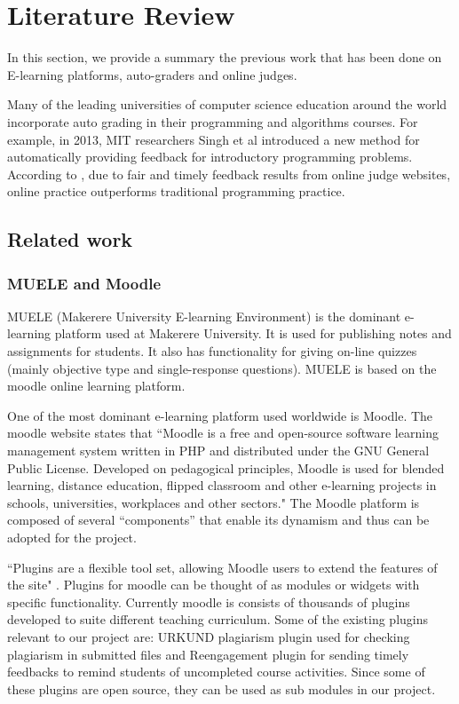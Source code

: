 \documentclass[12pt]{article}
\begin{document}
\newpage

\section{Literature Review}
	In this section, we provide a summary the previous work that has been done on E-learning platforms, auto-graders and online judges.
	
	Many of the leading universities of computer science education around the world incorporate auto grading in their 			programming and algorithms courses. For example, in 2013, MIT researchers Singh et al \cite{singh} introduced a new method for automatically providing feedback for introductory programming problems. According to \cite{ojpot}, due to fair and timely feedback results from online judge websites, online practice outperforms traditional programming practice.

	\subsection{Related work}
		\subsubsection{MUELE and Moodle}
		MUELE (Makerere University E-learning Environment) \cite{muele} is the dominant e-learning platform used at Makerere University. It is used for publishing notes and assignments for students. It also has functionality for giving on-line quizzes (mainly objective type and single-response questions). MUELE is based on the moodle online learning platform.
		
		One of the most dominant e-learning platform used worldwide is Moodle. The moodle website \cite{moodle} states that ``Moodle is a free and open-source software 	learning management system written in PHP and distributed under the GNU General Public License. Developed on pedagogical principles, Moodle is used for blended learning, distance education, flipped classroom and other e-learning projects in schools, universities, workplaces and other sectors." The Moodle platform is composed of several “components” that enable its dynamism and thus can be adopted for the project.
		
		``Plugins are a flexible tool set, allowing Moodle users to extend the features of the site" \cite{moodle}. Plugins for moodle can be thought of as modules or widgets with specific functionality. Currently moodle is consists of thousands of plugins developed to suite different teaching curriculum. Some of the existing plugins relevant to our project are: URKUND plagiarism plugin \cite{urkund} used for checking plagiarism in submitted files and Reengagement plugin \cite{reengagement} for sending timely feedbacks to remind students of uncompleted course activities. Since some of these plugins are open source, they can be used as sub modules in our project.
\end{document}
